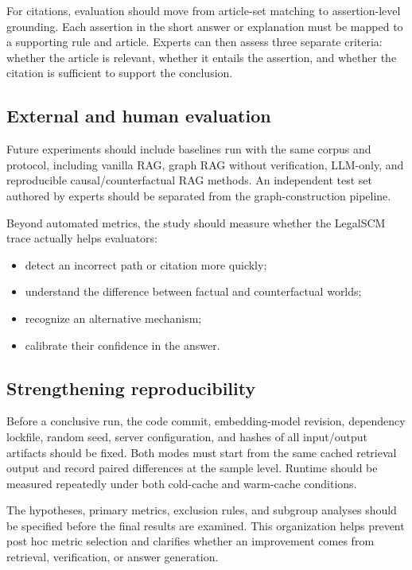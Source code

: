 For citations, evaluation should move from article-set matching to
assertion-level grounding. Each assertion in the short answer or explanation
must be mapped to a supporting rule and article. Experts can then assess
three separate criteria: whether the article is relevant, whether it entails
the assertion, and whether the citation is sufficient to support the
conclusion.

\subsection{External and human evaluation}

Future experiments should include baselines run with the same corpus and
protocol, including vanilla RAG, graph RAG without verification, LLM-only,
and reproducible causal/counterfactual RAG methods. An independent test set
authored by experts should be separated from the graph-construction pipeline.

Beyond automated metrics, the study should measure whether the LegalSCM
trace actually helps evaluators:

\begin{itemize}
    \item detect an incorrect path or citation more quickly;
    \item understand the difference between factual and counterfactual worlds;
    \item recognize an alternative mechanism;
    \item calibrate their confidence in the answer.
\end{itemize}

\subsection{Strengthening reproducibility}

Before a conclusive run, the code commit, embedding-model revision,
dependency lockfile, random seed, server configuration, and hashes of all
input/output artifacts should be fixed. Both modes must start from the same
cached retrieval output and record paired differences at the sample level.
Runtime should be measured repeatedly under both cold-cache and warm-cache
conditions.

The hypotheses, primary metrics, exclusion rules, and subgroup analyses
should be specified before the final results are examined. This organization
helps prevent post hoc metric selection and clarifies whether an improvement
comes from retrieval, verification, or answer generation.
